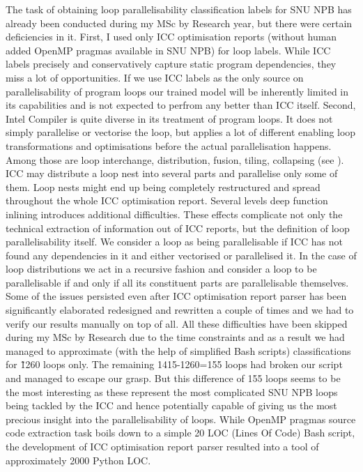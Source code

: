 \documentclass[10pt,a4paper]{report}
\begin{document}
The task of obtaining loop parallelisability classification labels for SNU NPB has already been conducted during my MSc by Research year, but there were certain deficiencies in it. First, I used only ICC optimisation reports (without human added OpenMP pragmas available in SNU NPB) for loop labels. While ICC labels precisely and conservatively capture static program dependencies, they miss a lot of opportunities. If we use ICC labels as the only source on parallelisability of program loops our trained model will be inherently limited in its capabilities and is not expected to perfrom any better than ICC itself. Second, Intel Compiler is quite diverse in its treatment of program loops. It does not simply parallelise or vectorise the loop, but applies a lot of different enabling loop transformations and optimisations before the actual parallelisation happens. Among those are loop interchange, distribution, fusion, tiling, collapsing (see \cite{Bacon:1994:CTH:197405.197406}). ICC may distribute a loop nest into several parts and parallelise only some of them. Loop nests might end up being completely restructured and spread throughout the whole ICC optimisation report. Several levels deep function inlining introduces additional difficulties. These effects complicate not only the technical extraction of information out of ICC reports, but the definition of loop parallelisability itself. We consider a loop as being parallelisable if ICC has not found any dependencies in it and either vectorised or parallelised it. In the case of loop distributions we act in a recursive fashion and consider a loop to be parallelisable if and only if all its constituent parts are parallelisable themselves. Some of the issues persisted even after ICC optimisation report parser has been significantly elaborated redesigned and rewritten a couple of times and we had to verify our results manually on top of all. All these difficulties have been skipped during my MSc by Research due to the time constraints and as a result we had managed to approximate (with the help of simplified Bash scripts) classifications for \~1260 loops only. The remaining 1415-1260=155 loops had broken our script and managed to escape our grasp. But this difference of 155 loops seems to be the most interesting as these represent the most complicated SNU NPB loops being tackled by the ICC and hence potentially capable of giving us the most precious insight into the parallelisability of loops. While OpenMP pragmas source code extraction task boils down to a simple 20 LOC (Lines Of Code) Bash script, the development of ICC optimisation report parser resulted into a tool \cite{github-icc-parser} of approximately 2000 Python LOC.
\end{document}
